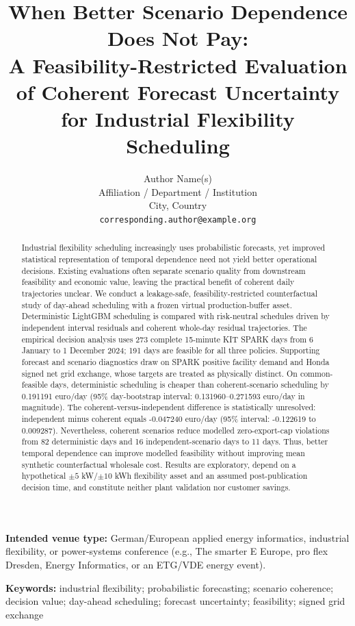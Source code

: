 \documentclass[10pt,twocolumn]{article}
\title{\textbf{When Better Scenario Dependence Does Not Pay:}\\
A Feasibility-Restricted Evaluation of Coherent Forecast Uncertainty for
Industrial Flexibility Scheduling}
\author{
  Author Name(s)\\
  \small Affiliation / Department / Institution\\
  \small City, Country\\
  \small \texttt{corresponding.author@example.org}
}
\date{}
\begin{document}
\maketitle

\begin{center}
\small\textbf{Intended venue type:} German/European applied energy informatics,
industrial flexibility, or power-systems conference (e.g., The smarter E
Europe, pro flex Dresden, Energy Informatics, or an ETG/VDE energy event).
\end{center}

\begin{abstract}
Industrial flexibility scheduling increasingly uses probabilistic forecasts,
yet improved statistical representation of temporal dependence need not yield
better operational decisions. Existing evaluations often separate scenario
quality from downstream feasibility and economic value, leaving the practical
benefit of coherent daily trajectories unclear. We conduct a leakage-safe,
feasibility-restricted counterfactual study of day-ahead scheduling with a
frozen virtual production-buffer asset. Deterministic LightGBM scheduling is
compared with risk-neutral schedules driven by independent interval residuals
and coherent whole-day residual trajectories. The empirical decision analysis
uses 273 complete 15-minute KIT SPARK days from 6 January to 1 December 2024;
191 days are feasible for all three policies. Supporting forecast and scenario
diagnostics draw on SPARK positive facility demand and Honda signed net grid
exchange, whose targets are treated as physically distinct. On common-feasible
days, deterministic scheduling is cheaper than coherent-scenario scheduling
by 0.191191 euro/day (95\% day-bootstrap interval: 0.131960--0.271593 euro/day
in magnitude). The coherent-versus-independent difference is statistically
unresolved: independent minus coherent equals -0.047240 euro/day (95\%
interval: -0.122619 to 0.009287). Nevertheless, coherent scenarios reduce
modelled zero-export-cap violations from 82 deterministic days and 16
independent-scenario days to 11 days. Thus, better temporal dependence can
improve modelled feasibility without improving mean synthetic counterfactual
wholesale cost. Results are exploratory, depend on a hypothetical
$\pm5$ kW/$\pm10$ kWh flexibility asset and an assumed post-publication
decision time, and constitute neither plant validation nor customer savings.
\end{abstract}

\noindent\textbf{Keywords:} industrial flexibility; probabilistic forecasting;
scenario coherence; decision value; day-ahead scheduling; forecast uncertainty;
feasibility; signed grid exchange
\end{document}
